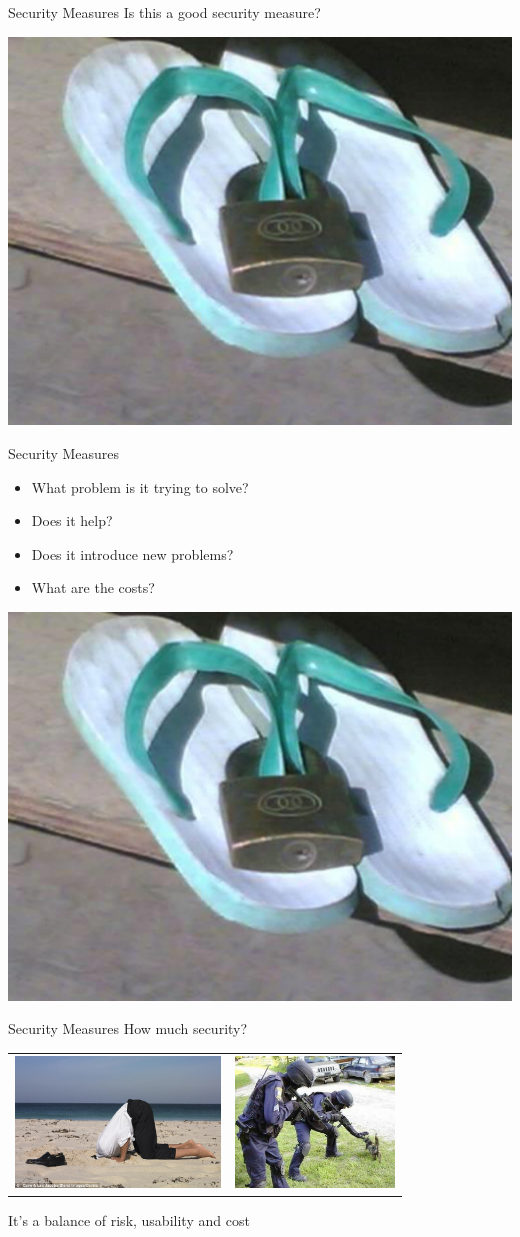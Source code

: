 \documentclass{beamer}
\begin{document}
\begin{frame}{Security Measures}
Is this a good security measure?
\begin{center}
\includegraphics[width=0.6\linewidth]{flipflops.png}
\end{center}
\end{frame}

\begin{frame}{Security Measures}
\begin{itemize}
 \item What problem is it trying to solve? 
 \item Does it help? 
 \item Does it introduce new problems? 
 \item What are the costs?
 \end{itemize} 
 \begin{center}
	\includegraphics[width=0.4\linewidth]{flipflops.png} 
 \end{center}
\end{frame}

\begin{frame}{Security Measures}
How much security?
\begin{tabular}{c c}
\includegraphics[height = 3.5cm]{ostrich.jpg}
& \includegraphics[height = 3.5cm]{cat.jpg}
\end{tabular}
\centering
It's a balance of risk, usability and cost 
\end{frame}
\end{document}
